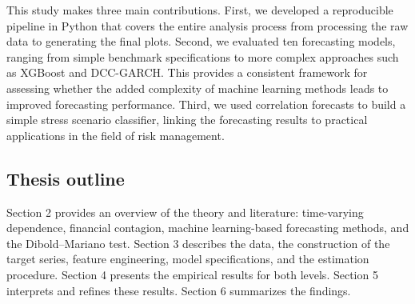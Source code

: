 This study makes three main contributions. First, we developed a reproducible pipeline in Python that covers the entire analysis process from processing the raw data to generating the final plots. Second, we evaluated ten forecasting models, ranging from simple benchmark specifications to more complex approaches such as XGBoost and DCC-GARCH. This provides a consistent framework for assessing whether the added complexity of machine learning methods leads to improved forecasting performance. Third, we used correlation forecasts to build a simple stress scenario classifier, linking the forecasting results to practical applications in the field of risk management.

\subsection{Thesis outline}

Section 2 provides an overview of the theory and literature: time-varying dependence, financial contagion, machine learning-based forecasting methods, and the Dibold–Mariano test. Section 3 describes the data, the construction of the target series, feature engineering, model specifications, and the estimation procedure. Section 4 presents the empirical results for both levels. Section 5 interprets and refines these results. Section 6 summarizes the findings.
